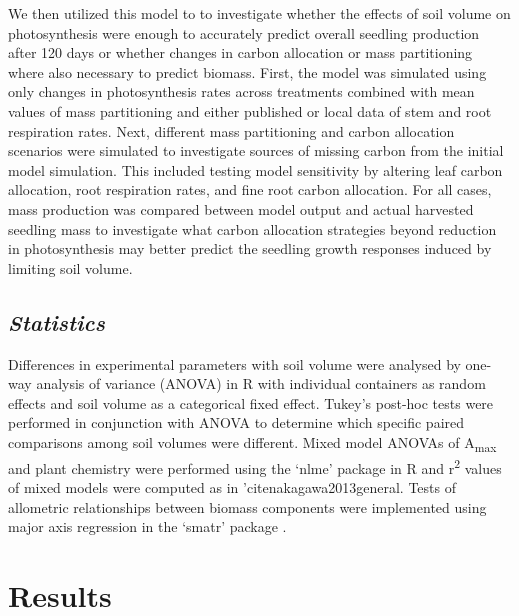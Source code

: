 \documentclass[a4paper]{article}\usepackage[]{graphicx}\usepackage[]{color}
\begin{document}
We then utilized this model to to investigate whether the effects of soil volume on photosynthesis were enough to accurately predict overall seedling production after 120 days or whether changes in carbon allocation or mass partitioning where also necessary to predict biomass. First, the model was simulated using only changes in photosynthesis rates across treatments combined with mean values of mass partitioning and either published or local data of stem and root respiration rates. Next, different mass partitioning and carbon allocation scenarios were simulated to investigate sources of missing carbon from the initial model simulation. This included testing model sensitivity by altering leaf carbon allocation, root respiration rates, and fine root carbon allocation. For all cases, mass production was compared between model output and actual harvested seedling mass to investigate what carbon allocation strategies beyond reduction in photosynthesis may better predict the seedling growth responses induced by limiting soil volume. 

\subsection*{\textit{Statistics}}
Differences in experimental parameters with soil volume were analysed by one-way analysis of variance (ANOVA) in R with individual containers as random effects and soil volume as a categorical fixed effect. Tukey’s post-hoc tests were performed in conjunction with ANOVA to determine which specific paired comparisons among soil volumes were different. Mixed model ANOVAs of A\textsubscript{max} and plant chemistry were performed using the ‘nlme’ package \citep{nlme} in R and r\textsuperscript{2} values of mixed models were computed as in 'cite{nakagawa2013general}. Tests of allometric relationships between biomass components were implemented using major axis regression in the ‘smatr’ package \citep{warton2012smatr}.

\section*{Results}
\end{document}
